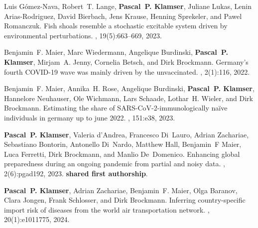 \documentclass[10pt,twocolumn]{article}
\begin{document}
\begin{thebibliography}{10}
Luis Gómez-Nava, Robert~T. Lange, \textbf{Pascal~P. Klamser}, Juliane Lukas, Lenin Arias-Rodriguez, David Bierbach, Jens Krause, Henning Sprekeler, and Pawel Romanczuk.
\newblock Fish shoals resemble a stochastic excitable system driven by environmental perturbations.
, 19(5):663--669, 2023.

Benjamin~F. Maier, Marc Wiedermann, Angelique Burdinski, \textbf{Pascal~P. Klamser}, Mirjam~A. Jenny, Cornelia Betsch, and Dirk Brockmann.
\newblock Germany’s fourth {COVID}-19 wave was mainly driven by the unvaccinated.
, 2(1):116, 2022.

Benjamin~F. Maier, Annika~H. Rose, Angelique Burdinski, \textbf{Pascal~P. Klamser}, Hannelore Neuhauser, Ole Wichmann, Lars Schaade, Lothar~H. Wieler, and Dirk Brockmann.
\newblock Estimating the share of {SARS}-{CoV}-2-immunologically naïve individuals in germany up to june 2022.
, 151:e38, 2023.

\textbf{Pascal~P. Klamser}, Valeria d’Andrea, Francesco Di~Lauro, Adrian Zachariae, Sebastiano Bontorin, Antonello Di~Nardo, Matthew Hall, Benjamin~F Maier, Luca Ferretti, Dirk Brockmann, and Manlio De~Domenico.
\newblock Enhancing global preparedness during an ongoing pandemic from partial and noisy data.
, 2(6):pgad192, 2023.
\newblock \textbf{shared first authorship}.

\textbf{Pascal~P. Klamser}, Adrian Zachariae, Benjamin~F. Maier, Olga Baranov, Clara Jongen, Frank Schlosser, and Dirk Brockmann.
\newblock Inferring country-specific import risk of diseases from the world air transportation network.
, 20(1):e1011775, 2024.

\end{thebibliography}

% 
% 
% 
% 
% 


% 
\end{document}

